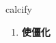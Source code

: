 
\begin{frame}
{\huge calcify}
\begin{center}
\begin{enumerate}\Large
  \item \textbf{使僵化}
\end{enumerate}
\end{center}
\end{frame}
